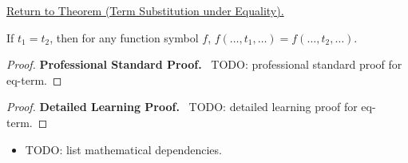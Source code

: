 \newpage
{}
\label{prf:eq-term}

\begin{remark*}[Return]
\hyperref[thm:eq-term]{Return to Theorem (Term Substitution under Equality).}
\end{remark*}

\begin{theorem*}
If $t_1 = t_2$, then for any function symbol $f$,
$f(\dots,t_1,\dots) = f(\dots,t_2,\dots)$.
\end{theorem*}

\begin{proof}
\textbf{Professional Standard Proof.}~
TODO: professional standard proof for eq-term.
\end{proof}

\begin{proof}
\textbf{Detailed Learning Proof.}~
TODO: detailed learning proof for eq-term.
\end{proof}

\begin{remark*}
\end{remark*}

\begin{dependencies}
\begin{itemize}
  \item TODO: list mathematical dependencies.
\end{itemize}
\end{dependencies}

\clearpage
